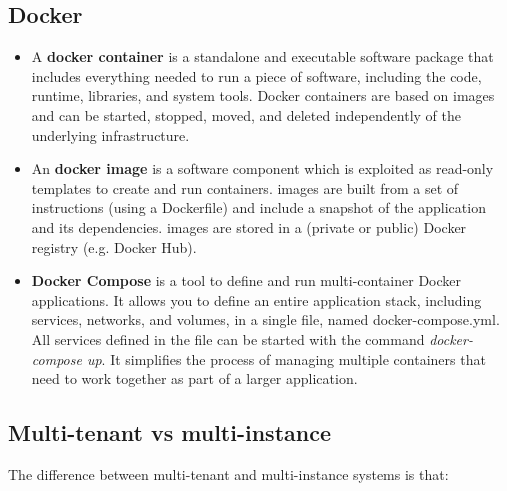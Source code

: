 \subsection{Docker}
\begin{itemize}
   \item A \textbf{docker container} is a standalone and executable software package that includes everything needed to run a piece of software, including the code, runtime, libraries, and system tools.
         Docker containers are based on images and can be started, stopped, moved, and deleted independently of the underlying infrastructure.
   \item An \textbf{docker image} is a software component which is exploited as read-only templates to create and run containers. images are built from a set of instructions (using a Dockerfile) and include a snapshot of the application and its dependencies. images are stored in a (private or public) Docker registry (e.g. Docker Hub).
   \item \textbf{Docker Compose} is a tool to define and run multi-container Docker applications. It allows you to define an entire application stack, including services, networks, and volumes, in a single file, named docker-compose.yml. All services defined in the file can be started with the command \textit{docker-compose up}. It simplifies the process of managing multiple containers that need to work together as part of a larger application.
\end{itemize}

\subsection{Multi-tenant vs multi-instance}
The difference between multi-tenant and multi-instance systems is that:

